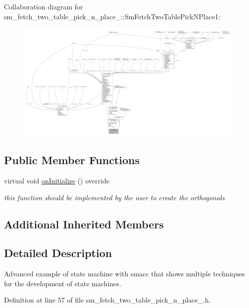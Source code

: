 Collaboration diagram for sm\+\_\+fetch\+\_\+two\+\_\+table\+\_\+pick\+\_\+n\+\_\+place\+\_\+:\+:Sm\+Fetch\+Two\+Table\+Pick\+N\+Place1\+:
\nopagebreak
\begin{figure}[H]
\begin{center}
\leavevmode
\includegraphics[width=350pt]{structsm__fetch__two__table__pick__n__place__1_1_1SmFetchTwoTablePickNPlace1__coll__graph}
\end{center}
\end{figure}
\subsection*{Public Member Functions}
\begin{DoxyCompactItemize}
\item 
virtual void \hyperlink{structsm__fetch__two__table__pick__n__place__1_1_1SmFetchTwoTablePickNPlace1_a30c707dad93553ebd88c0bb82a8586c5}{on\+Initialize} () override
\begin{DoxyCompactList}\small\item\em this function should be implemented by the user to create the orthogonals \end{DoxyCompactList}\end{DoxyCompactItemize}
\subsection*{Additional Inherited Members}


\subsection{Detailed Description}
Advanced example of state machine with smacc that shows multiple techniques for the development of state machines. 

Definition at line 57 of file sm\+\_\+fetch\+\_\+two\+\_\+table\+\_\+pick\+\_\+n\+\_\+place\+\_.\+h.



